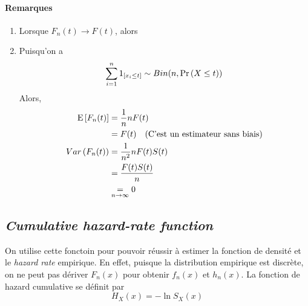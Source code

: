 \documentclass[12pt, french]{report}
\begin{document}
\paragraph{Remarques}
\begin{enumerate}[label=(\arabic*)]
\item Lorsque $F_n(t) \to F(t)$, alors

\item Puisqu'on a
\begin{align*}
\sum_{i=1}^{n} 1_{[x_i \leq t]} \sim Bin(n,\Pr \left( X \leq t \right))
\end{align*}
Alors,
\begin{align*}
\mathrm{E} \left[ F_n(t) \right]		& = \frac{1}{n} n F(t) \\
	& = F(t) \quad \text{(C'est un estimateur sans biais)} \\
Var \left( F_n(t) \right) & = \frac{1}{n^2}  n F(t) S(t) \\
	& = \frac{F(t) S(t)}{n}	\\
	& \underset{n \to \infty}{=} 0 \\
\end{align*}
\end{enumerate}

\subsection{\textit{Cumulative hazard-rate function}}
On utilise cette fonctoin pour pouvoir réussir à estimer la fonction de densité et le \textit{hazard rate} empirique. En effet, puisque la distribution empirique est discrète, on ne peut pas dériver $F_n(x)$ pour obtenir $f_n(x)$ et $h_n(x)$. La fonction de hazard cumulative se définit par
\begin{equation}
H_X(x) = - \ln S_X(x)
\end{equation}
\end{document}
